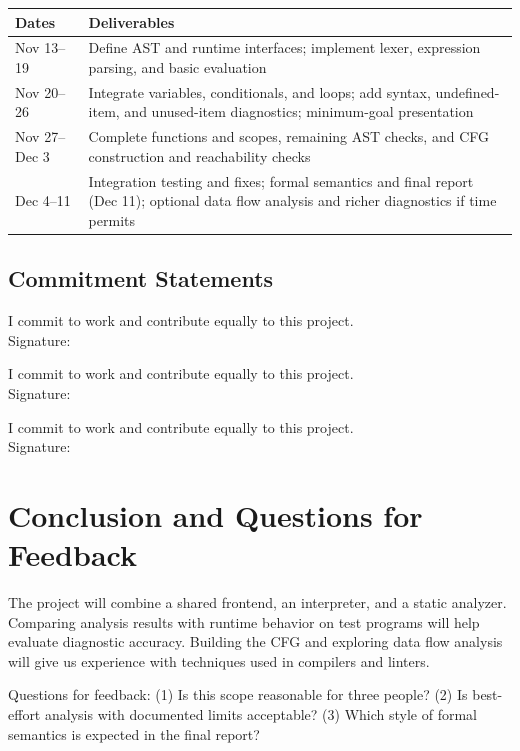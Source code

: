 \documentclass{article}
\begin{document}
\begin{center}
\small
\begin{tabularx}{\linewidth}{@{}l>{\raggedright\arraybackslash}X@{}}
\toprule
Dates & Deliverables \\
\midrule
Nov 13--19 & Define AST and runtime interfaces; implement lexer, expression parsing, and basic evaluation \\
\midrule
Nov 20--26 & Integrate variables, conditionals, and loops; add syntax, undefined-item, and unused-item diagnostics; minimum-goal presentation \\
\midrule
Nov 27--Dec 3 & Complete functions and scopes, remaining AST checks, and CFG construction and reachability checks \\
\midrule
Dec 4--11 & Integration testing and fixes; formal semantics and final report (Dec 11); optional data flow analysis and richer diagnostics if time permits \\
\bottomrule
\end{tabularx}
\end{center}

\subsection{Commitment Statements}
\noindent I commit to work and contribute equally to this project.
\\Signature: \underline{\hspace{1.2in}}

\medskip
\noindent I commit to work and contribute equally to this project.
\\Signature: \underline{\hspace{1.2in}}

\medskip
\noindent I commit to work and contribute equally to this project.
\\Signature: \underline{\hspace{1.2in}}

\section{Conclusion and Questions for Feedback}
The project will combine a shared frontend, an interpreter, and a static
analyzer. Comparing analysis results with runtime behavior on test programs
will help evaluate diagnostic accuracy. Building the CFG and exploring data
flow analysis will give us experience with techniques used in compilers and
linters.

Questions for feedback: (1) Is this scope reasonable for three people?
(2) Is best-effort analysis with documented limits acceptable? (3) Which
style of formal semantics is expected in the final report?

\renewcommand{\refname}{References Cited}
\begingroup
\raggedright


\endgroup
\end{document}

